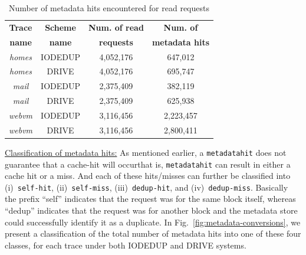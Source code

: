 \begin{table}[t]
	\caption{Number of metadata hits encountered for read requests}
	\label{tab:num-metadata-hits}
	\centering
	\begin{tabular}{|c|c|c|c|} \hline
		\textbf{Trace} & \textbf{Scheme} & \textbf{Num. of read} & \textbf{Num. of} \\
			  \textbf{name} & \textbf{name} & \textbf{requests} & \textbf{metadata hits} \\ \hline
		\textit{homes} & IODEDUP & 4,052,176 & 647,012 \\ \hline
	   	\textit{homes} & DRIVE & 4,052,176 & 695,747 \\ \hline
		\textit{mail} & IODEDUP & 2,375,409 & 382,119 \\ \hline
		\textit{mail} & DRIVE & 2,375,409 & 625,938 \\ \hline
	    \textit{webvm} & IODEDUP & 3,116,456 & 2,223,457 \\ \hline
		\textit{webvm} & DRIVE & 3,116,456 & 2,800,411 \\ \hline
	\end{tabular}
\end{table}



\underline{Classification of metadata hits:}
As mentioned earlier, a \texttt{metadatahit} does not guarantee that
a cache-hit will occur\textemdash{}that is, \texttt{metadatahit} can result 
in either a cache hit or a miss. And each of these hits/misses
can further be classified into (i)~\texttt{self-hit}, 
(ii)~\texttt{self-miss}, 
(iii)~\texttt{dedup-hit}, and
(iv)~\texttt{dedup-miss}. Basically the prefix ``self'' indicates
that the request was for the same block itself, whereas ``dedup''
indicates that the request was for another block and the metadata
store could successfully identify it as a duplicate.
In Fig.~\ref{fig:metadata-conversions}, we present a classification
of the total number of metadata hits into one of these four
classes, for each trace under both IODEDUP and DRIVE systems.

